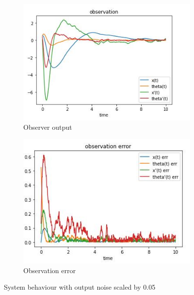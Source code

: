 \documentclass[12pt,letterpaper]{article}
\begin{document}
    \begin{figure}[htb]
        \begin{subfigure}{.5\textwidth}
            \centering
        \includegraphics[width=1\linewidth]{images/filter/output_noise_005.jpg}
        \caption{Observer output}
        \label{fig:output_noise_005_obs}
        \end{subfigure}
        \begin{subfigure}{.5\textwidth}
          \centering
          \includegraphics[width=1\linewidth]{images/filter/output_noise_005_err.jpg}
          \caption{Observation error}
        \label{fig:output_noise_005_err}
        \end{subfigure}
    \caption{System behaviour with output noise scaled by 0.05}
    \label{fig:output_noise_005}
    \end{figure}
\end{document}
